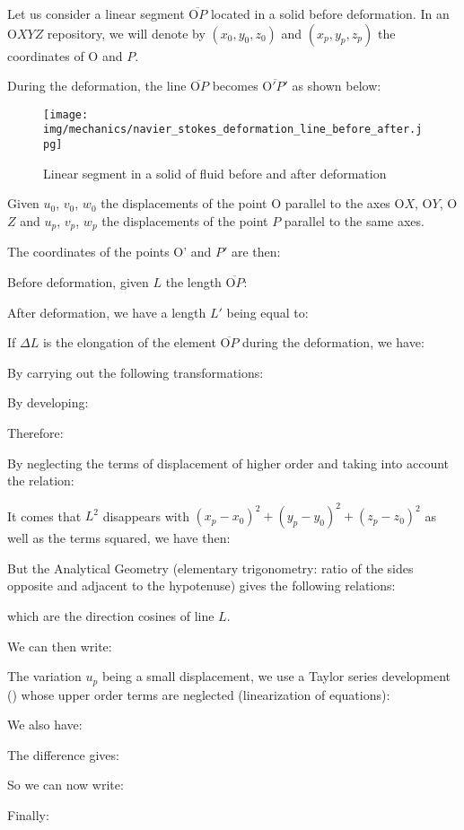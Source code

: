 	Let us consider a linear segment $\overline{\text{O}P}$ located in a solid before deformation. In an O$XYZ$ repository, we will denote by $(x_0,y_0,z_0)$ and $(x_p,y_p,z_p)$ the coordinates of O and $P$.

	During the deformation, the line $\overline{\text{O}P}$ becomes $\overline{\text{O}'P'}$ as shown below:
	\begin{figure}[H]
		\centering
		\texttt{[image: img/mechanics/navier\_stokes\_deformation\_line\_before\_after.jpg]}
		\caption[]{Linear segment in a solid of fluid before and after deformation}
	\end{figure}
	Given $u_0$, $v_0$, $w_0$ the displacements of the point O parallel to the axes O$X$, O$Y$, O$Z$ and $u_p$, $v_p$, $w_p$ the displacements of the point $P$ parallel to the same axes.

	The coordinates of the points O' and $P'$ are then:
	
	Before deformation, given $L$ the length $\overline{\text{O}P}$:
	
	After deformation, we have a length $L'$ being equal to:
	
	If $\Delta L$ is the elongation of the element $\overline{\text{O}P}$ during the deformation, we have:
	
	By carrying out the following transformations:
	
	By developing:
	
	Therefore:
	
	By neglecting the terms of displacement of higher order and taking into account the relation:
	
	It comes that $L^2$ disappears with $(x_p-x_0)^2+(y_p-y_0)^2+(z_p-z_0)^2$ as well as the terms squared, we have then:
	
	But the Analytical Geometry (elementary trigonometry: ratio of the sides opposite and adjacent to the hypotenuse) gives the following relations:
	
	which are the direction cosines of line $L$.

	We can then write:
	
	The variation $u_p$ being a small displacement, we use a Taylor series development () whose upper order terms are neglected (linearization of equations):
	
	We also have:
	
	The difference gives:
	
	So we can now write:
	
	Finally:
	
